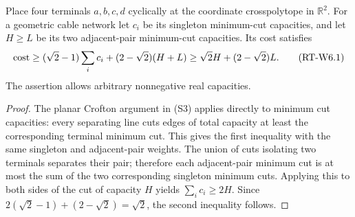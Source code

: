 \begin{lemma}
\label{rt:cut-submod}
Place four terminals $a,b,c,d$ cyclically at the coordinate
crosspolytope in $\mathbb R^2$. For a geometric cable network let
$c_i$ be its singleton minimum-cut capacities, and let $H\ge L$
be its two adjacent-pair minimum-cut capacities. Its cost satisfies
\[
 \operatorname{cost}\ge(\sqrt2-1)\sum_i c_i+(2-\sqrt2)(H+L)
 \ge\sqrt2 H+(2-\sqrt2)L.                 \tag{RT-W6.1}
\]
The assertion allows arbitrary nonnegative real capacities.
\end{lemma}
\begin{proof}
The planar Crofton argument in (S3) applies directly to minimum
cut capacities: every separating line cuts edges of total capacity
at least the corresponding terminal minimum cut. This gives the
first inequality with the same singleton and adjacent-pair weights.
The union of cuts isolating two terminals separates their pair;
therefore each adjacent-pair minimum cut is at most the sum of
the two corresponding singleton minimum cuts. Applying this to
both sides of the cut of capacity $H$ yields $\sum_i c_i\ge2H$.
Since $2(\sqrt2-1)+(2-\sqrt2)=\sqrt2$, the second inequality follows.
\end{proof}

